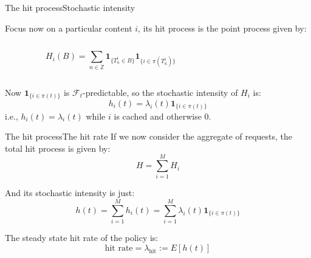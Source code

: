 \documentclass[aspectratio=169]{beamer}
\newcommand{\ind}[1]{\mathbf{1}_{#1}}
\begin{document}
\begin{frame}{The hit process}{Stochastic intensity}
	
	Focus now on a particular content $i$, its \alert{hit process} is the point process given by:

	\vfill

	\begin{columns}
		\begin{column}{0.5\textwidth}
			\begin{equation*}
				H_i(B) = \sum_{n\in\mathbb{Z}} \ind{\{T_n^i\in B\}}\ind{\{i\in \pi(T_n^i)\}}
			\end{equation*}
		\end{column}
		\begin{column}{0.5\textwidth}

		\end{column}
	\end{columns}

	\vfill

	Now $\ind{\{i\in \pi(t)\}}$ is $\mathcal{F}_t$-predictable, so the stochastic intensity of $H_i$ is:
	\begin{equation*}
		h_i(t) = \lambda_i(t) \ind{\{i\in \pi(t)\}}
	\end{equation*}
	i.e., $h_i(t)=\lambda_i(t)$ while $i$ is cached and otherwise $0$.
\end{frame}

\begin{frame}{The hit process}{The hit rate}
	If we now consider the aggregate of requests, the \alert{total hit process} is given by:
	\begin{equation*}
		H = \sum_{i=1}^M H_i
	\end{equation*}

	And its stochastic intensity is just:
	\begin{equation*}
		h(t) = \sum_{i=1}^M h_i(t) = \sum_{i=1}^M \lambda_i(t) \ind{\{i\in \pi(t)\}}
	\end{equation*}

	The steady state \alert{hit rate} of the policy is:
	\begin{equation*}
		\text{hit rate} = \lambda_{\text{hit}} := E[h(t)]
	\end{equation*}
	
\end{frame}
\end{document}
